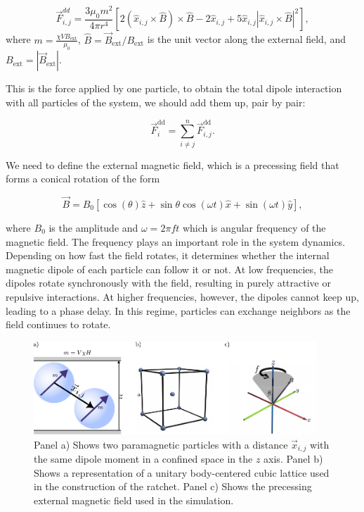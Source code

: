 \begin{equation}
  \label{eq:dipoledipoleforce_Bext}
  \vec{F}^{dd}_{i,j} = \frac{3\mu_0 m^2}{4\pi r^4}
\left[ 2(\hat{x}_{i,j} \times \hat{B}) \times \hat{B} - 2\hat{x}_{i,j} + 5\hat{x}_{i,j}|\hat{x}_{i,j} \times \hat{B}|^2 \right],
\end{equation}
where $m = \frac{\chi V B_{\text{ext}}}{\mu_0}$, $\hat{B} = \vec{B}_{\text{ext}}/B_{\text{ext}}$ is the unit vector along the external field, and $B_{\text{ext}} = |\vec{B}_{\text{ext}}|$. 

This is the force applied by one particle, to obtain the total dipole interaction with all particles of the system, we should add them up, pair by pair:

\begin{equation}
  \vec{F}^{\mathrm{dd}}_i = \sum^{n}_{i \neq j} \vec{F}^{\mathrm{dd}}_{i,j}.  
  \label{eq:dipolesum}
\end{equation}

We need to define the external magnetic field, which is a precessing field that forms a conical rotation of the form

\begin{equation}
  \vec{B} = B_0 [\cos{(\theta)}\hat{z} + \sin{\theta}\cos{(\omega t)}\hat{x} + \sin{(\omega t)}\hat{y}],
  \label{eq:magneticfield}
\end{equation}


where $B_0$ is the amplitude and $\omega = 2\pi f t$ which is angular frequency of the magnetic field. The frequency plays an important role in the system dynamics. Depending on how fast the field rotates, it determines whether the internal magnetic dipole of each particle can follow it or not. At low frequencies, the dipoles rotate synchronously with the field, resulting in purely attractive or repulsive interactions. At higher frequencies, however, the dipoles cannot keep up, leading to a phase delay. In this regime, particles can exchange neighbors as the field continues to rotate.


\begin{figure}[H]
  \begin{center}
    \includegraphics[width=0.95\textwidth]{figures/methods1.pdf}
  \end{center}
  \caption[Representation of the paramagnetic colloids, body-centered-cubic lattice used for the ratchet, and the precessing conic magnetic field.]{Panel a) Shows two paramagnetic particles with a distance \(\vec{x}_{i,j}\) with the same dipole moment in a confined space in the \( z\) axis. Panel b) Shows a representation of a  unitary body-centered cubic lattice used in the construction of the ratchet. Panel c) Shows the precessing external magnetic field used in the simulation.}\label{fig:facecenteredlattice}
\end{figure}

